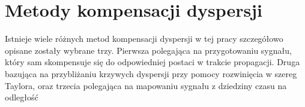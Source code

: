 
\chapter{Metody kompensacji dyspersji}
\label{cha:comp_disp}
 
Istnieje wiele różnych metod kompensacji dyspersji w tej pracy szczegółowo opisane zostały wybrane trzy. Pierwsza polegająca na przygotowaniu sygnału, który sam skompensuje się do odpowiedniej postaci w trakcie propagacji. Druga bazująca na przybliżaniu krzywych dyspersji przy pomocy rozwinięcia w szereg Taylora, oraz trzecia polegająca na mapowaniu sygnału z dziedziny czasu na odległość 
 






